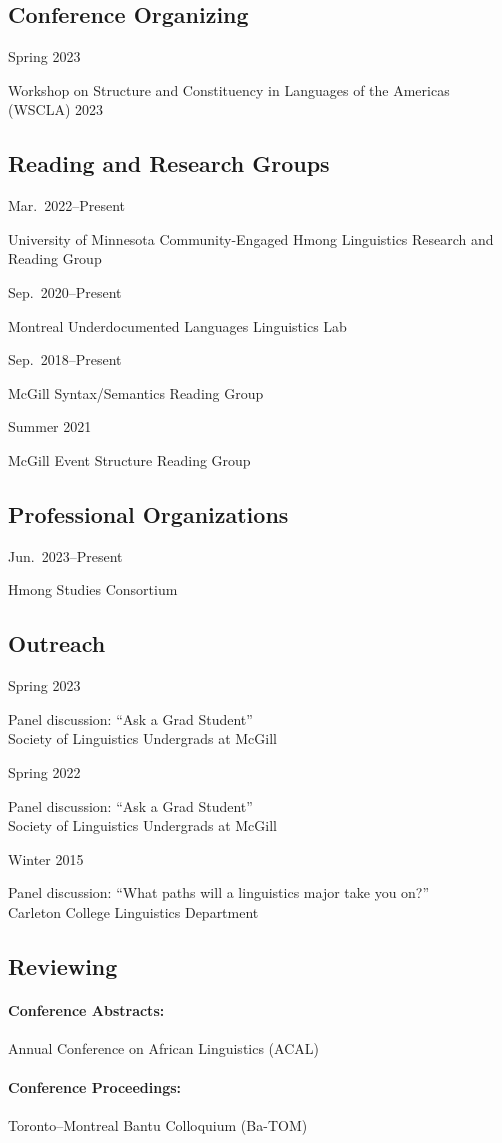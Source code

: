 \documentclass[11pt,oneside,DIV=calc,parskip=off]{scrarticle} %
\newlength{\leftcolwidth}
\newlength{\rightcolwidth}
\newlength{\spacingbefore}
\newlength{\spacingafter}
\newcommand{\mytwocol}[2]{%
	\vspace{\spacingbefore}%
	\begin{minipage}[t]{\leftcolwidth}%
		\strut#1%
	\end{minipage}%
	\begin{minipage}[t]{\rightcolwidth}%
		\strut#2%
	\end{minipage}%
	\vspace{\spacingafter}\par%
	}
\newcommand{\cvline}[2]{%
	\mytwocol{#1}{#2}%
	}
\begin{document}
\subsection{Conference Organizing}
\cvline{Spring 2023}{Workshop on Structure and Constituency in Languages of the Americas (WSCLA) 2023}

\subsection{Reading and Research Groups}
\cvline{Mar.\ 2022--Present}{University of Minnesota Community-Engaged Hmong Linguistics Research and Reading Group}
\cvline{Sep.\ 2020--Present}{Montreal Underdocumented Languages Linguistics Lab %
}
\cvline{Sep.\ 2018--Present}{McGill Syntax/Semantics Reading Group}
\cvline{Summer 2021}{McGill Event Structure Reading Group}

\subsection{Professional Organizations}
\cvline{Jun.\ 2023--Present}{Hmong Studies Consortium}

\subsection{Outreach}
\cvline{Spring 2023}{Panel discussion: ``Ask a Grad Student''\\Society of Linguistics Undergrads at McGill}
\cvline{Spring 2022}{Panel discussion: ``Ask a Grad Student''\\Society of Linguistics Undergrads at McGill}
\cvline{Winter 2015}{Panel discussion: ``What paths will a linguistics major take you on?''\\Carleton College Linguistics Department}

\subsection{Reviewing}
\paragraph{Conference Abstracts:} Annual Conference on African Linguistics (ACAL)
\paragraph{Conference Proceedings:} Toronto--Montreal Bantu Colloquium (Ba-TOM)
\end{document}
